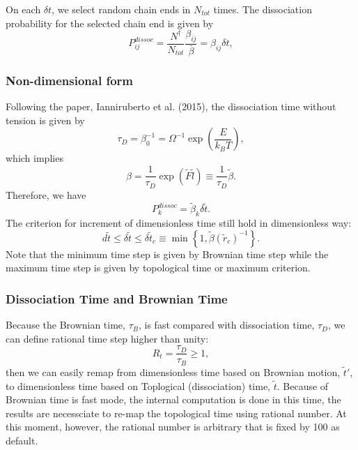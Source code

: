\documentclass[10pt, a4paper]{article}
\begin{document}
On each $\delta t$, we select random chain ends in $N_{tot}$ times. The dissociation probability for the selected chain end is given by
\begin{equation}
P^{dissoc}_{ij} = \frac{N^\dagger}{N_{tot}}\frac{\beta_{ij}}{\bar{\beta}} = \beta_{ij}\delta t,
\end{equation}

\subsubsection{Non-dimensional form}
Following the paper, Ianniruberto et al. (2015), the dissociation time without tension is given by
\begin{equation}
\tau_D = \beta_0^{-1} = \Omega^{-1}\exp\left(\frac{E}{k_BT}\right),
\end{equation}
which implies
\begin{equation}
\beta = \frac{1}{\tau_D}\exp(\tilde{F}\tilde{l}) \equiv \frac{1}{\tau_D}\tilde{\beta}.
\end{equation}
Therefore, we have
\begin{equation}
P^{dissoc}_k = \tilde{\beta}_k\delta \tilde{t}.
\end{equation}
The criterion for increment of dimensionless time still hold in dimensionless way:
\begin{equation}
  d\tilde{t} \leq \delta \tilde{t} \leq \delta \tilde{t}_c \equiv \min\left\{1, \tilde{\beta}(\tilde{r}_c)^{-1}\right\}.
  \label{eq:delta_t_criterion}
\end{equation}
Note that the minimum time step is given by Brownian time step while the maximum time step is given by topological time or maximum criterion.

\subsubsection{Dissociation Time and Brownian Time}
Because the Brownian time, $\tau_B$, is fast compared with dissociation time, $\tau_D$, we can define rational time step higher than unity:
\begin{equation}
R_t = \frac{\tau_D}{\tau_B} \geq 1, 
\end{equation}
then we can easily remap from dimensionless time based on Brownian motion, $\tilde{t}'$, to dimensionless time based on Toplogical (dissociation) time, $\tilde{t}$. Because of Brownian time is fast mode, the internal computation is done in this time, the results are necessciate to re-map the topological time using rational number. At this moment, however, the rational number is arbitrary that is fixed by 100 as default.
\end{document}
